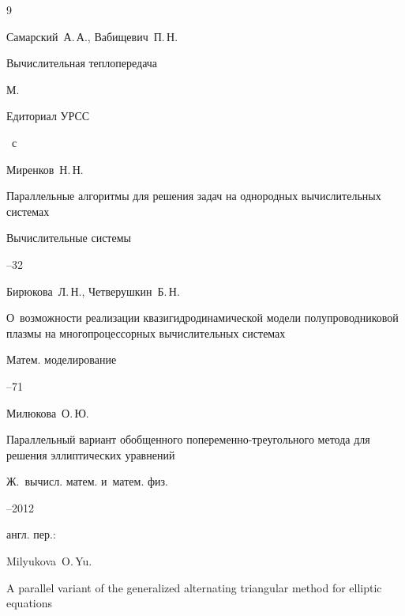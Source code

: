 \begin{thebibliography}{9}




\by Самарский~А.\,А., Вабищевич~П.\,Н.

\book Вычислительная теплопередача

\publaddr М.

\publ Едиториал УРСС 


~с




\by Миренков~Н.\,Н.

\paper Параллельные алгоритмы для решения задач на однородных вычислительных системах

\jour Вычислительные системы



--32




\by Бирюкова~Л.\,Н., Четверушкин~Б.\,Н.

\paper О~возможности реализации квазигидродинамической модели полупроводниковой плазмы на многопроцессорных вычислительных системах

\jour Матем. моделирование




--71




\by Милюкова~О.\,Ю.

\paper Параллельный вариант обобщенного попеременно-треугольного метода для решения эллиптических уравнений

\jour Ж.~вычисл. матем. и~матем. физ.




--2012

\transl

англ. пер.:

\by Milyukova~O.\,Yu.

\paper  A parallel variant of the generalized alternating triangular method for elliptic equations


\end{thebibliography}
